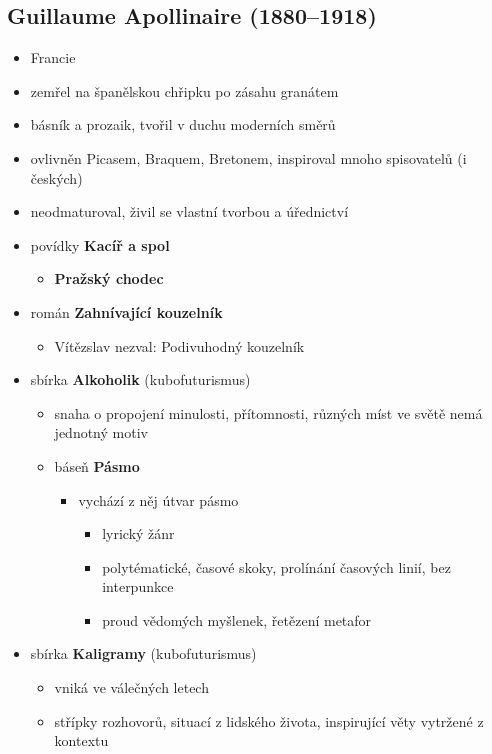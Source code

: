 \subsection{Guillaume Apollinaire (1880--1918)}
\begin{itemize}
\item Francie
\item zemřel na španělskou chřipku po zásahu granátem
\item básník a prozaik, tvořil v duchu moderních směrů
\item ovlivněn Picasem, Braquem, Bretonem, inspiroval mnoho spisovatelů (i českých)
\item neodmaturoval, živil se vlastní tvorbou a úřednictví
\item povídky \textbf{Kacíř a spol}
	\begin{itemize}
	\item \textbf{Pražský chodec}
	\end{itemize}
\item román \textbf{Zahnívající kouzelník}
	\begin{itemize}
	\item[\ra] Vítězslav nezval: Podivuhodný kouzelník 
	\end{itemize}
\item sbírka \textbf{Alkoholik} (kubofuturismus)
	\begin{itemize}
	\item snaha o propojení minulosti, přítomnosti, různých míst ve světě \ra nemá jednotný motiv
	\item báseň \textbf{Pásmo}
		\begin{itemize}
		\item vychází z něj útvar pásmo
			\begin{itemize}
			\item lyrický žánr
			\item polytématické, časové skoky, prolínání časových linií, bez interpunkce
			\item proud vědomých myšlenek, řetězení metafor
			\end{itemize}
		\end{itemize}
	\end{itemize}
\item sbírka \textbf{Kaligramy} (kubofuturismus)
	\begin{itemize}
	\item vniká ve válečných letech
	\item střípky rozhovorů, situací z lidského života, inspirující věty vytržené z kontextu

\end{itemize}
\end{itemize}
